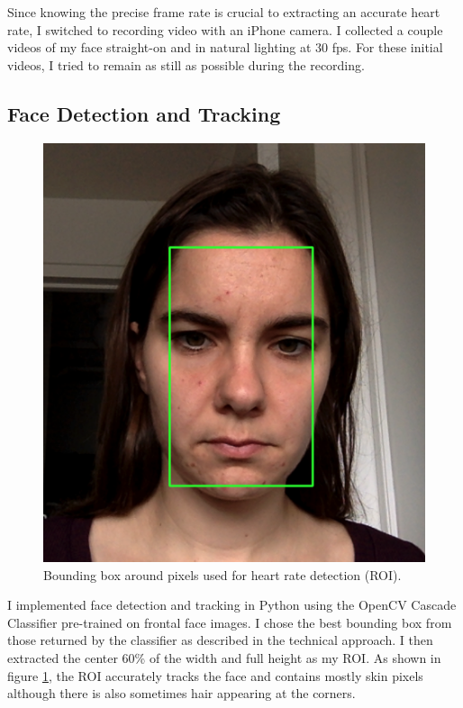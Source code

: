 \documentclass[11pt,twocolumn,letterpaper]{article}
\begin{document}
Since knowing the precise frame rate is crucial to extracting an accurate heart rate, I switched to recording video with an iPhone camera. I collected a couple videos of my face straight-on and in natural lighting at 30 fps. For these initial videos, I tried to remain as still as possible during the recording.

\subsection*{Face Detection and Tracking}

\begin{figure}
\begin{center}
	\includegraphics[scale=0.2]{face_bb}
\end{center}
\caption{Bounding box around pixels used for heart rate detection (ROI).}
\label{face_bb}
\end{figure}

I implemented face detection and tracking in Python using the OpenCV Cascade Classifier pre-trained on frontal face images. I chose the best bounding box from those returned by the classifier as described in the technical approach. I then extracted the center 60\% of the width and full height as my ROI. As shown in figure \ref{face_bb}, the ROI accurately tracks the face and contains mostly skin pixels although there is also sometimes hair appearing at the corners.
\end{document}
